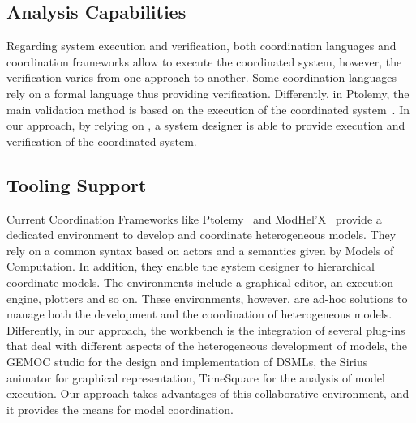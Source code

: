 \subsection{Analysis Capabilities}
Regarding system execution and verification, both coordination languages and coordination frameworks allow to execute the coordinated system, however, the verification varies from one approach to another. Some coordination languages rely on a formal language thus providing verification. Differently, in Ptolemy, the main validation method is based on the execution of the coordinated system~\cite{ptoleframebib}. In our approach, by relying on \ccsl, a system designer is able to provide execution and verification of the coordinated system.

\subsection{Tooling Support}
Current Coordination Frameworks like Ptolemy~\cite{ptoleframebib} and ModHel'X~\cite{modhelxbib} provide a dedicated environment to develop and coordinate heterogeneous models. They rely on a common syntax based on actors and a semantics given by Models of Computation. In addition, they enable the system designer to hierarchical coordinate models. The environments include a graphical editor, an execution engine, plotters and so on. These environments, however, are ad-hoc solutions to manage both the development and the coordination of heterogeneous models. Differently, in our approach, the workbench is the integration of several plug-ins that deal with different aspects of the heterogeneous development of models, \eg the GEMOC studio for the design and implementation of DSMLs, the Sirius animator for graphical representation, TimeSquare for the analysis of model execution. Our approach takes advantages of this collaborative environment, and it provides the means for model coordination.
